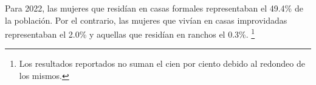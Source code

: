 Para 2022, las mujeres que residían en casas formales representaban el 49.4\% de la población. Por el contrario, las mujeres que vivían en casas improvidadas representaban el 2.0\% y aquellas que residían en ranchos el 0.3\%. \footnote{Los resultados reportados no suman el cien por ciento debido al redondeo de los mismos.}